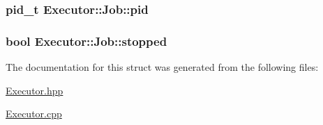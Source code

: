 \label{structExecutor_1_1Job_a38039efac2d62af668c99b63719f6125}
\hypertarget{structExecutor_1_1Job_a8d9163526e877fe1f603b66504ef8950}{
\subsubsection[{pid}]{\setlength{\rightskip}{0pt plus 5cm}pid\_\-t {\bf Executor::Job::pid}}}
\label{structExecutor_1_1Job_a8d9163526e877fe1f603b66504ef8950}
\hypertarget{structExecutor_1_1Job_ac0ea0bc0c71fe4c1a2ad981df09fb5b0}{
\subsubsection[{stopped}]{\setlength{\rightskip}{0pt plus 5cm}bool {\bf Executor::Job::stopped}}}
\label{structExecutor_1_1Job_ac0ea0bc0c71fe4c1a2ad981df09fb5b0}


The documentation for this struct was generated from the following files:\begin{DoxyCompactItemize}
\item 
\hyperlink{Executor_8hpp}{Executor.hpp}\item 
\hyperlink{Executor_8cpp}{Executor.cpp}\end{DoxyCompactItemize}
